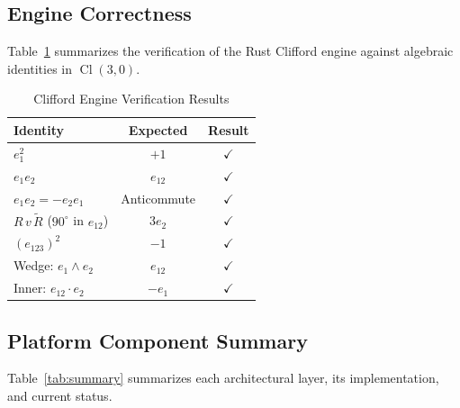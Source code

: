 \documentclass[conference]{IEEEtran}
\begin{document}
\subsection{Engine Correctness}
Table~\ref{tab:verify} summarizes the verification of the Rust Clifford engine against algebraic identities in $\operatorname{Cl}(3,0)$.

\begin{table}[htbp]
\caption{Clifford Engine Verification Results}
\centering
\begin{tabular}{p{4.0cm} c c}
\toprule
\textbf{Identity} & \textbf{Expected} & \textbf{Result} \\
\midrule
$e_1^2$ & $+1$ & $\checkmark$ \\
$e_1 e_2$ & $e_{12}$ & $\checkmark$ \\
$e_1 e_2 = -e_2 e_1$ & Anticommute & $\checkmark$ \\
$R\,v\,\tilde{R}$ ($90^\circ$ in $e_{12}$) & $3e_2$ & $\checkmark$ \\
$(e_{123})^2$ & $-1$ & $\checkmark$ \\
Wedge: $e_1 \wedge e_2$ & $e_{12}$ & $\checkmark$ \\
Inner: $e_{12} \cdot e_2$ & $-e_1$ & $\checkmark$ \\
\bottomrule
\end{tabular}
\label{tab:verify}
\end{table}

\subsection{Platform Component Summary}
Table~\ref{tab:summary} summarizes each architectural layer, its implementation, and current status.
\end{document}
